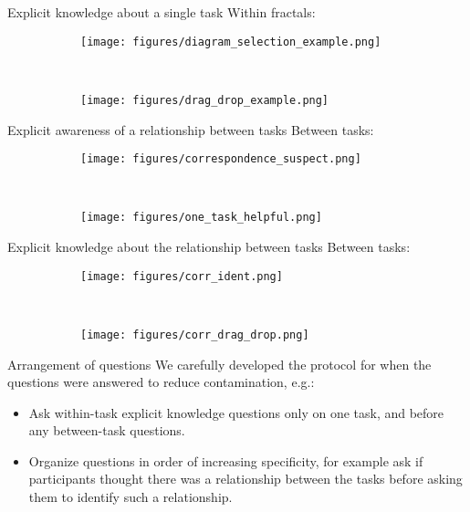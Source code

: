 \documentclass{beamer}
\begin{document}

\begin{frame}{Explicit knowledge about a single task}
Within fractals:
\begin{figure}
\centering
\begin{subfigure}{0.45\textwidth}
\texttt{[image: figures/diagram\_selection\_example.png]}
\end{subfigure}~
\begin{subfigure}{0.45\textwidth}
\texttt{[image: figures/drag\_drop\_example.png]}
\end{subfigure}
\end{figure}
\end{frame}

\begin{frame}{Explicit awareness of a relationship between tasks}
Between tasks:
\begin{figure}
\centering
\begin{subfigure}{0.45\textwidth}
\texttt{[image: figures/correspondence\_suspect.png]}
\end{subfigure}~
\begin{subfigure}{0.45\textwidth}
\texttt{[image: figures/one\_task\_helpful.png]}
\end{subfigure}
\end{figure}
\end{frame}

\begin{frame}{Explicit knowledge about the relationship between tasks}
Between tasks:
\begin{figure}
\centering
\begin{subfigure}{0.45\textwidth}
\texttt{[image: figures/corr\_ident.png]}
\end{subfigure}~
\begin{subfigure}{0.45\textwidth}
\texttt{[image: figures/corr\_drag\_drop.png]}
\end{subfigure}
\end{figure}
\end{frame}

\begin{frame}{Arrangement of questions}
We carefully developed the protocol for when the questions were answered to reduce contamination, e.g.:
\begin{itemize}
\item<2-> Ask within-task explicit knowledge questions only on one task, and before any between-task questions.
\item<3-> Organize questions in order of increasing specificity, for example ask if participants thought there was a relationship between the tasks before asking them to identify such a relationship. 
\end{itemize}
\end{frame}
\end{document}
